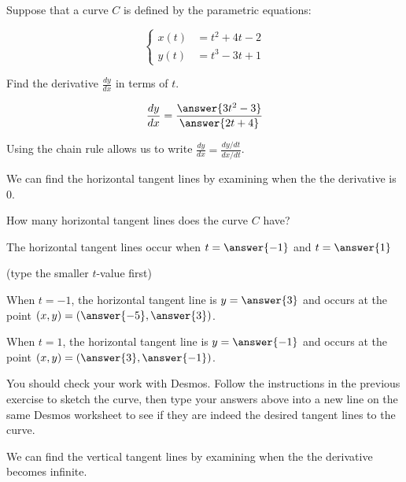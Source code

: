 \documentclass{ximera}
\author{Jim Talamo}
\begin{document}
\begin{exercise}

Suppose that a curve $C$ is defined by the parametric equations:

\[
\begin{cases}
x(t) &= t^2+4t-2 \\
y(t) &= t^3-3t+1
\end{cases}
\]

Find the derivative $\frac{dy}{dx}$ in terms of $t$.

\[
\frac{dy}{dx} = \frac{\answer{3t^2-3}}{\answer{2t+4}}
\]

\begin{hint}
Using the chain rule allows us to write $\frac{dy}{dx} = \frac{dy/dt}{dx/dt}$.
\end{hint}

\begin{exercise}
We can find the horizontal tangent lines by examining when the the derivative is $0$.

How many horizontal tangent lines does the curve $C$ have?
\begin{multipleChoice}
\end{multipleChoice}

The horizontal tangent lines occur when $t=\answer{-1}$ and $t=\answer{1}$

(type the smaller $t$-value first)

\begin{exercise}
When $t=-1$, the horizontal tangent line is $y=\answer{3}$ and occurs at the point $(x,y) = \left(\answer{-5},\answer{3}\right)$.

When $t=1$, the horizontal tangent line is $y=\answer{-1}$ and occurs at the point $(x,y) = \left(\answer{3},\answer{-1}\right)$.

\begin{exercise}
You should check your work with Desmos.  Follow the instructions in the previous exercise to sketch the curve, then type your answers above into a new line on the same Desmos worksheet to see if they are indeed the desired tangent lines to the curve.
\end{exercise}

\end{exercise}
\end{exercise}

\begin{exercise}
We can find the vertical tangent lines by examining when the the derivative becomes infinite.


\end{exercise}
\end{exercise}
\end{document}
